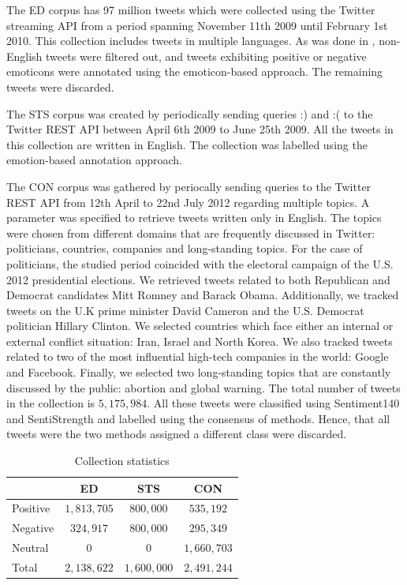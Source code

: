 \documentclass{sig-alternate}
\begin{document}
The ED corpus has 97 million tweets which were collected using the Twitter streaming API from a period spanning November 11th 2009 until February 1st 2010. This collection includes tweets in multiple languages. As was done in \cite{bifet2010}, non-English tweets were filtered out, and tweets exhibiting positive or negative emoticons were annotated using the emoticon-based approach. The remaining tweets were discarded.

The STS corpus was created by periodically sending queries :) and :( to the Twitter REST API between April 6th 2009 to June 25th 2009. All the tweets in this collection are written in English. The collection was labelled using the emotion-based annotation approach.

The CON corpus was gathered by periocally sending queries to the Twitter REST API from 12th April to 22nd July 2012 regarding multiple topics. A parameter was specified to retrieve tweets written only in English. The topics were chosen from different domains that are frequently discussed in Twitter: politicians, countries, companies and long-standing topics. For the case of politicians, the studied period coincided with the electoral campaign of the U.S. 2012 presidential elections. We retrieved tweets related to both Republican and Democrat candidates Mitt Romney and Barack Obama. Additionally, we
tracked tweets on the U.K prime minister David Cameron and the U.S. Democrat politician Hillary Clinton. We selected countries which face either an internal or external conflict situation: Iran, Israel and North Korea. We also tracked tweets related to two of the most influential high-tech companies in the world: Google and Facebook.  Finally, we selected two long-standing topics that are constantly discussed by the public: abortion and global warning. The total number of tweets in the collection is $5,175,984$. All these tweets were classified using Sentiment140 and SentiStrength and labelled using the consensus of methods. Hence, that all tweets were the two methods assigned a different class were discarded.



\begin{table}[htbp]
\begin{center}
\begin{tabular}{l|c|c|c}
\hline
 & ED & STS & CON \\ \hline
Positive & $1,813,705$ & $800,000$ & $535,192$ \\ 
Negative & $324,917$ & $800,000$ & $295,349$ \\ 
Neutral & 0 & 0 & $1,660,703$ \\ \hline
Total & $2,138,622$ & $1,600,000$ & $2,491,244$ \\ 
\end{tabular}
\end{center}
\caption{Collection statistics}
\label{tab:colstats}
\end{table}
\end{document}
